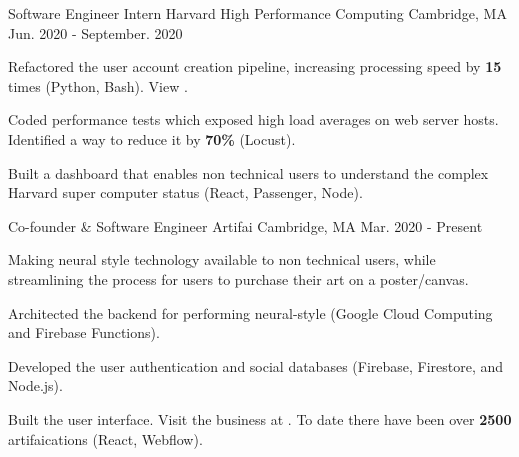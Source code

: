 

\begin{cventries}

  \cventry
    {Software Engineer Intern} %
    {Harvard High Performance Computing} %
    {Cambridge, MA} %
    {Jun. 2020 - September. 2020} %
    {
      \begin{cvitems} %
      \item {Refactored the user account creation pipeline, increasing processing speed by \textbf{15} times (Python, Bash). View .} 
      \item {Coded performance tests which exposed high load averages on web server hosts. Identified a way to reduce it by \textbf{70\%} (Locust).}
      \item {Built a dashboard that enables non technical users to understand the complex Harvard super computer status (React, Passenger, Node).}
      \end{cvitems}
    }

  \cventry
    {Co-founder \& Software Engineer} %
    {Artifai} %
    {Cambridge, MA} %
    {Mar. 2020 - Present} %
    {
      \begin{cvitems} %
      \item {Making neural style technology available to non technical users, while streamlining the process for users to purchase their art on a poster/canvas.}
      \item {Architected the backend for performing neural-style (Google Cloud Computing and Firebase Functions).}
      \item {Developed the user authentication and social databases (Firebase, Firestore, and Node.js).}
      \item {Built the user interface. Visit the business at . To date there have been over \textbf{2500} artifaications (React, Webflow).}
      \end{cvitems}
    }


\end{cventries}

